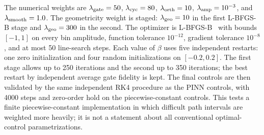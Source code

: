 \documentclass[aps,prx,reprint,superscriptaddress,nofootinbib,longbibliography,floatfix,showkeys]{revtex4-2}
\begin{document}
The numerical weights are
$\lambda_{\rm gate}=50$, $\lambda_{\rm cyc}=80$,
$\lambda_{\rm orth}=10$, $\lambda_{\rm amp}=10^{-3}$, and
$\lambda_{\rm smooth}=1.0$.  The geometricity weight is staged:
$\lambda_{\rm geo}=10$ in the first L-BFGS-B stage and
$\lambda_{\rm geo}=300$ in the second.  The optimizer is
L-BFGS-B~\cite{Zhu1997LBFGSB} with bounds $[-1,1]$ on every bin
amplitude, function tolerance $10^{-12}$, gradient tolerance $10^{-8}$,
and at most 50 line-search steps.  Each value of $\beta$ uses five
independent restarts: one zero initialization and four random
initializations on $[-0.2,0.2]$.  The first stage allows up to 250
iterations and the second up to 350 iterations; the best restart by
independent average gate fidelity is kept.  The final controls are then
validated by the same independent RK4 procedure as the PINN controls, with
4000 steps and zero-order hold on the piecewise-constant controls.  This
tests a finite piecewise-constant implementation in which difficult path
intervals are weighted more heavily; it is not a statement about all
conventional optimal-control parametrizations.


\end{document}
